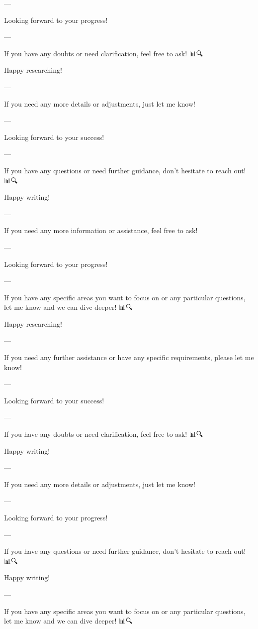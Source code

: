 --- 

Looking forward to your progress! 🚀🌟

--- 

If you have any doubts or need clarification, feel free to ask! 📊🔍

Happy researching! 📝🚀

--- 

If you need any more details or adjustments, just let me know! 🙌

--- 

Looking forward to your success! 🚀🌟

--- 

If you have any questions or need further guidance, don't hesitate to reach out! 📊🔍

Happy writing! 📝✨

--- 

If you need any more information or assistance, feel free to ask! 🙌

--- 

Looking forward to your progress! 🚀🌟

--- 

If you have any specific areas you want to focus on or any particular questions, let me know and we can dive deeper! 📊🔍

Happy researching! 📝🚀

--- 

If you need any further assistance or have any specific requirements, please let me know! 🙌

--- 

Looking forward to your success! 🚀🌟

--- 

If you have any doubts or need clarification, feel free to ask! 📊🔍

Happy writing! 📝✨

--- 

If you need any more details or adjustments, just let me know! 🙌

--- 

Looking forward to your progress! 🚀🌟

--- 

If you have any questions or need further guidance, don't hesitate to reach out! 📊🔍

Happy writing! 📝✨

--- 

If you have any specific areas you want to focus on or any particular questions, let me know and we can dive deeper! 📊🔍

